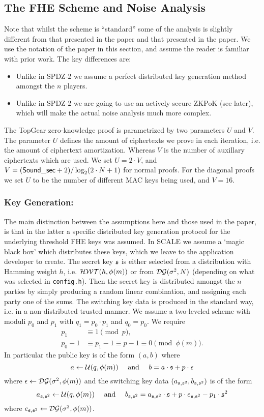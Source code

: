 \subsection{The FHE Scheme and Noise Analysis}
Note that whilst the scheme is ``standard'' some of the
analysis is slightly different from that presented in the \cite{SPDZ2} paper 
and that presented in the \cite{GHS12c} paper.
We use the notation of the \cite{SPDZ2} paper in this section,
and assume the reader is familiar with prior work.
The key differences are:
\begin{itemize}
\item Unlike in SPDZ-2 we assume a perfect distributed key generation method
amongst the $n$ players.
\item Unlike in SPDZ-2 we are going to use an actively secure ZKPoK (see later),
which will make the actual noise analysis much more complex.
\end{itemize}
The TopGear zero-knowledge proof is parametrized by two
parameters $U$ and $V$.
The parameter $U$ defines the amount of ciphertexts we prove in
each iteration, i.e. the amount of ciphertext amortization.
Whereas $V$ is the number of auxillary ciphertexts which are used.
We set $U = 2 \cdot V$, and $V= (\mathsf{Sound\_sec}+2)/\log_2 (2 \cdot N+1)$
for normal proofs.
For the diagonal proofs we set $U$ to be the number of different
MAC keys being used, and $V=16$.


\subsubsection{Key Generation:}
The main distinction between the assumptions here and those used in 
the \cite{SPDZ2} paper, is that in the latter a specific distributed 
key generation protocol for the underlying threshold FHE keys was
assumed. In SCALE we assume a `magic black box' which distributes
these keys, which we leave to the application developer to create.
The secret key $\mathfrak{s}$ is either selected from a distribution with
Hamming weight $h$, i.e. $\mathcal{HWT}(h,\phi(m))$ or from
$\mathcal{DG}(\sigma^2,N)$ (depending on what was selected in \verb|config.h|).
Then the secret key is distributed amongst the $n$ parties by simply producing a random 
linear combination, and assigning each party one of the sums.
The switching key data is produced in the standard way, i.e.
in a non-distributed trusted manner.
We assume a two-leveled scheme with moduli $p_0$ and $p_1$ with $q_1=p_0 \cdot p_1$
and $q_0=p_0$.
We require 
\begin{align*}
   p_1 & \equiv 1 \pmod{p}, \\
   p_0 - 1 & \equiv p_1-1 \equiv p-1 \equiv 0 \pmod{\phi(m)}.
\end{align*}
In particular the public key is of the form $(a,b)$ where
\[ a \leftarrow \mathcal{U}(q,\phi(m)) \quad \mbox{ and } \quad b = a \cdot \mathfrak{s} + p \cdot \epsilon \]
where $\epsilon \leftarrow \mathcal{DG}(\sigma^2,\phi(m))$ 
and the switching key data $(a_{\mathfrak{s},\mathfrak{s}^2},b_{\mathfrak{s},\mathfrak{s}^2})$ is of the form
\[ a_{\mathfrak{s},\mathfrak{s}^2} \leftarrow \mathcal{U}(q,\phi(m)) \quad \mbox{ and } \quad 
   b_{\mathfrak{s},\mathfrak{s}^2} =   a_{\mathfrak{s},\mathfrak{s}^2} \cdot \mathfrak{s} + p \cdot e_{\mathfrak{s},\mathfrak{s}^2} - p_1 \cdot \mathfrak{s}^2 \]
where $e_{\mathfrak{s},\mathfrak{s}^2} \leftarrow \mathcal{DG}(\sigma^2,\phi(m))$.


